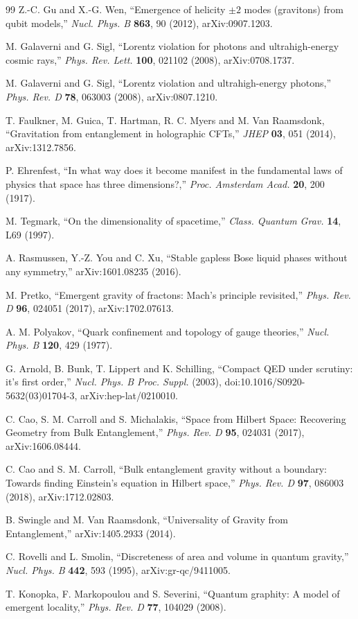 \documentclass[aps,prd,onecolumn,nofootinbib,superscriptaddress]{revtex4-2}
\begin{document}
\begin{thebibliography}{99}
Z.-C. Gu and X.-G. Wen, ``Emergence of helicity $\pm 2$ modes (gravitons) from qubit models,'' \emph{Nucl. Phys. B} \textbf{863}, 90 (2012), arXiv:0907.1203.

M. Galaverni and G. Sigl, ``Lorentz violation for photons and ultrahigh-energy cosmic rays,'' \emph{Phys. Rev. Lett.} \textbf{100}, 021102 (2008), arXiv:0708.1737.

M. Galaverni and G. Sigl, ``Lorentz violation and ultrahigh-energy photons,'' \emph{Phys. Rev. D} \textbf{78}, 063003 (2008), arXiv:0807.1210.

T. Faulkner, M. Guica, T. Hartman, R. C. Myers and M. Van Raamsdonk, ``Gravitation from entanglement in holographic CFTs,'' \emph{JHEP} \textbf{03}, 051 (2014), arXiv:1312.7856.

P. Ehrenfest, ``In what way does it become manifest in the fundamental laws of physics that space has three dimensions?,'' \emph{Proc. Amsterdam Acad.} \textbf{20}, 200 (1917).

M. Tegmark, ``On the dimensionality of spacetime,'' \emph{Class. Quantum Grav.} \textbf{14}, L69 (1997).

A. Rasmussen, Y.-Z. You and C. Xu, ``Stable gapless Bose liquid phases without any symmetry,'' arXiv:1601.08235 (2016).

M. Pretko, ``Emergent gravity of fractons: Mach's principle revisited,'' \emph{Phys. Rev. D} \textbf{96}, 024051 (2017), arXiv:1702.07613.

A. M. Polyakov, ``Quark confinement and topology of gauge theories,'' \emph{Nucl. Phys. B} \textbf{120}, 429 (1977).

G. Arnold, B. Bunk, T. Lippert and K. Schilling, ``Compact QED under scrutiny: it's first order,'' \emph{Nucl. Phys. B Proc. Suppl.} (2003), doi:10.1016/S0920-5632(03)01704-3, arXiv:hep-lat/0210010.

C. Cao, S. M. Carroll and S. Michalakis, ``Space from Hilbert Space: Recovering Geometry from Bulk Entanglement,'' \emph{Phys. Rev. D} \textbf{95}, 024031 (2017), arXiv:1606.08444.

C. Cao and S. M. Carroll, ``Bulk entanglement gravity without a boundary: Towards finding Einstein's equation in Hilbert space,'' \emph{Phys. Rev. D} \textbf{97}, 086003 (2018), arXiv:1712.02803.

B. Swingle and M. Van Raamsdonk, ``Universality of Gravity from Entanglement,'' arXiv:1405.2933 (2014).

C. Rovelli and L. Smolin, ``Discreteness of area and volume in quantum gravity,'' \emph{Nucl. Phys. B} \textbf{442}, 593 (1995), arXiv:gr-qc/9411005.

T. Konopka, F. Markopoulou and S. Severini, ``Quantum graphity: A model of emergent locality,'' \emph{Phys. Rev. D} \textbf{77}, 104029 (2008).

\end{thebibliography}
\end{document}
